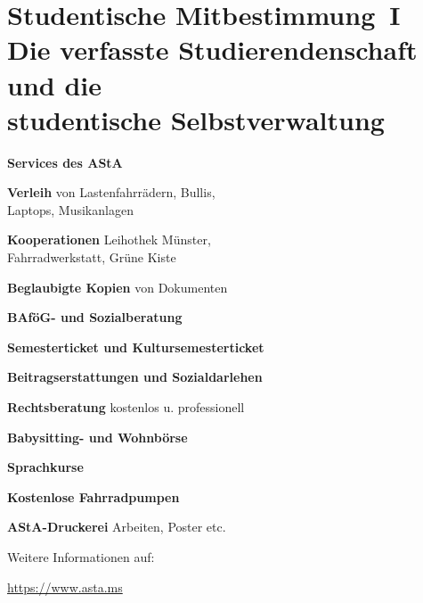 \section[Studentische Mitbestimmung]{Studentische Mitbestimmung~I\\Die verfasste Studierendenschaft und die \\studentische Selbstverwaltung}
\label{studmit}

\begin{center}
	\begin{minipage}{0.60\textwidth}
	\end{minipage}
	\begin{minipage}{0.35\textwidth}
		\begin{center}
			\textbf{Services des AStA}
		\end{center}
		\footnotesize

		\textbf{Verleih} von Lastenfahrrädern, Bullis, \\
		Laptops, Musikanlagen
		
		\textbf{Kooperationen} Leihothek Münster, \\
		Fahrradwerkstatt, Grüne Kiste
		
		\textbf{Beglaubigte Kopien} von Dokumenten
		
		\textbf{BAföG- und Sozialberatung}
		
		\textbf{Semesterticket und Kultursemesterticket}
		
		\textbf{Beitragserstattungen und Sozialdarlehen}
		
		\textbf{Rechtsberatung} kostenlos u. professionell
		
		\textbf{Babysitting- und Wohnbörse}
		
		\textbf{Sprachkurse}
		
	        \textbf{Kostenlose Fahrradpumpen}
            	
		\textbf{AStA-Druckerei} Arbeiten, Poster etc.
		
		Weitere Informationen auf:
		
		\url{https://www.asta.ms}
	\end{minipage}
\end{center}

